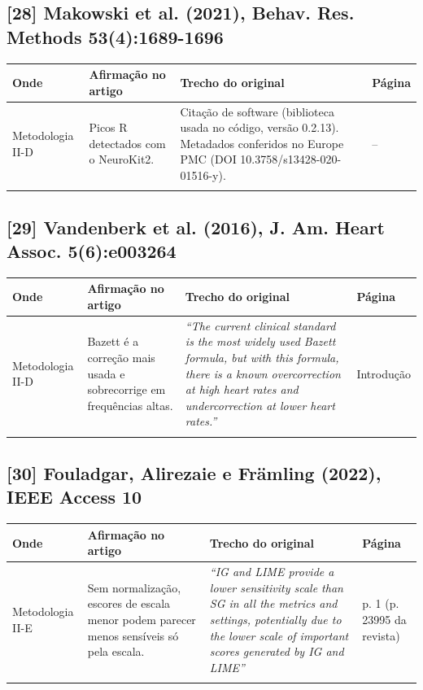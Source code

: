 \documentclass[11pt,a4paper]{article}
\begin{document}
\subsection*{[28] Makowski et al. (2021), Behav. Res. Methods 53(4):1689-1696}
\begin{longtable}{>{\raggedright\arraybackslash}p{2.6cm}>{\raggedright\arraybackslash}p{4.6cm}>{\raggedright\arraybackslash}p{7.6cm}>{\raggedright\arraybackslash}p{1.4cm}}
\toprule
\textbf{Onde} & \textbf{Afirmação no artigo} & \textbf{Trecho do original} & \textbf{Página} \\
\midrule
Metodologia II-D & Picos R detectados com o NeuroKit2. & Citação de software (biblioteca usada no código, versão 0.2.13). Metadados conferidos no Europe PMC (DOI 10.3758/s13428-020-01516-y). & -- \\
\addlinespace
\bottomrule
\end{longtable}
\subsection*{[29] Vandenberk et al. (2016), J. Am. Heart Assoc. 5(6):e003264}
\begin{longtable}{>{\raggedright\arraybackslash}p{2.6cm}>{\raggedright\arraybackslash}p{4.6cm}>{\raggedright\arraybackslash}p{7.6cm}>{\raggedright\arraybackslash}p{1.4cm}}
\toprule
\textbf{Onde} & \textbf{Afirmação no artigo} & \textbf{Trecho do original} & \textbf{Página} \\
\midrule
Metodologia II-D & Bazett é a correção mais usada e sobrecorrige em frequências altas. & \textit{``The current clinical standard is the most widely used Bazett formula, but with this formula, there is a known overcorrection at high heart rates and undercorrection at lower heart rates.''} & Introdução \\
\addlinespace
\bottomrule
\end{longtable}
\subsection*{[30] Fouladgar, Alirezaie e Främling (2022), IEEE Access 10}
\begin{longtable}{>{\raggedright\arraybackslash}p{2.6cm}>{\raggedright\arraybackslash}p{4.6cm}>{\raggedright\arraybackslash}p{7.6cm}>{\raggedright\arraybackslash}p{1.4cm}}
\toprule
\textbf{Onde} & \textbf{Afirmação no artigo} & \textbf{Trecho do original} & \textbf{Página} \\
\midrule
Metodologia II-E & Sem normalização, escores de escala menor podem parecer menos sensíveis só pela escala. & \textit{``IG and LIME provide a lower sensitivity scale than SG in all the metrics and settings, potentially due to the lower scale of important scores generated by IG and LIME''} & p. 1 (p. 23995 da revista) \\
\addlinespace
\bottomrule
\end{longtable}
\end{document}
